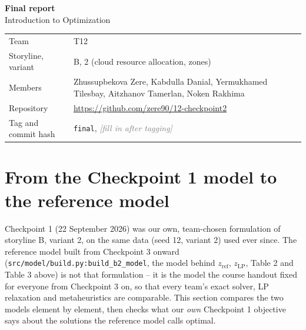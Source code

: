 \documentclass[11pt,a4paper]{article}
\newcommand{\hint}[1]{\textcolor{gray}{\textit{[#1]}}}
\newcommand{\zref}{z_{\mathrm{ref}}}
\newcommand{\zLP}{z_{\mathrm{LP}}}
\begin{document}
\begin{center}
{\LARGE\bfseries Final report}\\[4pt]
{\large Introduction to Optimization}
\end{center}

\begin{tabularx}{\textwidth}{@{}lX@{}}
\toprule
Team & T12 \\
Storyline, variant & B, 2 (cloud resource allocation, zones) \\
Members & Zhussupbekova Zere, Kabdulla Danial, Yermukhamed Tilesbay, Aitzhanov Tamerlan, Noken Rakhima \\
Repository & \url{https://github.com/zere90/12-checkpoint2} \\
Tag and commit hash & \texttt{final}, \hint{fill in after tagging} \\
\bottomrule
\end{tabularx}

\section{From the Checkpoint 1 model to the reference model}

Checkpoint 1 (22 September 2026) was our own, team-chosen formulation of storyline B, variant 2, on the same data (seed 12, variant 2) used ever since. The reference model built from Checkpoint 3 onward (\texttt{src/model/build.py:build\_b2\_model}, the model behind $\zref$, $\zLP$, Table 2 and Table 3 above) is not that formulation -- it is the model the course handout fixed for everyone from Checkpoint 3 on, so that every team's exact solver, LP relaxation and metaheuristics are comparable. This section compares the two models element by element, then checks what our \emph{own} Checkpoint 1 objective says about the solutions the reference model calls optimal.
\end{document}
